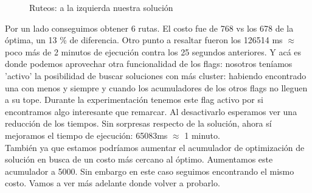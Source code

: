 \documentclass[11pt,a4paper]{article}
\begin{document}
\begin{figure}[!h]
\caption{Ruteos: a la izquierda nuestra solución}
\end{figure}
\bigskip
Por un lado conseguimos obtener 6 rutas. El costo fue de 768 vs los 678 de la óptima, un 13 \% de diferencia. Otro punto a resaltar fueron los 126514 ms $\approx$ poco más de 2 minutos de ejecución contra los 25 segundos anteriores. Y acá es donde podemos aprovechar otra funcionalidad de los flags: nosotros teníamos 'activo' la posibilidad de buscar soluciones con más cluster: habiendo encontrado una con menos y siempre y cuando los acumuladores de los otros flags no lleguen a su tope. Durante la experimentación tenemos este flag activo por si encontramos algo interesante que remarcar.  Al desactivarlo esperamos ver una reducción de los tiempos. Sin sorpresas respecto de la solución, ahora sí mejoramos el tiempo de ejecución: 65083ms $\approx$ 1 minuto. \\
También ya que estamos podríamos aumentar el acumulador de optimización de solución en busca de un costo más cercano al óptimo. Aumentamos este acumulador a 5000. Sin embargo en este caso seguimos encontrando el mismo costo. Vamos a ver más adelante donde volver a probarlo.
\bigskip		
\end{document}
